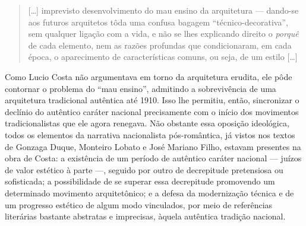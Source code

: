 \begin{quote}
{[}\ldots{]} imprevisto desenvolvimento do mau ensino da arquitetura ---
dando-se aos futuros arquitetos tôda uma confusa bagagem
``técnico-decorativa'', sem qualquer ligação com a vida, e não se lhes
explicando direito o \emph{porquê} de cada elemento, nem as razões
profundas que condicionaram, em cada época, o aparecimento de
características comuns, ou seja, de um estilo {[}\ldots{]}
\autocite[p.~39]{costa:1937documentacao1}
\end{quote}

Como Lucio Costa não argumentava em torno da arquitetura erudita, ele
pôde contornar o problema do ``mau ensino'', admitindo a sobrevivência
de uma arquitetura tradicional autêntica até 1910. Isso lhe permitiu,
então, sincronizar o declínio do autêntico caráter nacional precisamente
com o início dos movimentos tradicionalistas que ele agora renegava. Não
obstante essa oposição ideológica, todos os elementos da narrativa
nacionalista pós-romântica, já vistos nos textos de Gonzaga Duque,
Monteiro Lobato e José Mariano Filho, estavam presentes na obra de
Costa: a existência de um período de autêntico caráter nacional ---
juízos de valor estético à parte ---, seguido por outro de decrepitude
pretensiosa ou sofisticada; a possibilidade de se superar essa
decrepitude promovendo um determinado movimento arquitetônico; e a
defesa da modernização técnica e de um progresso estético de algum modo
vinculados, por meio de referências literárias bastante abstratas e
imprecisas, àquela autêntica tradição nacional.
